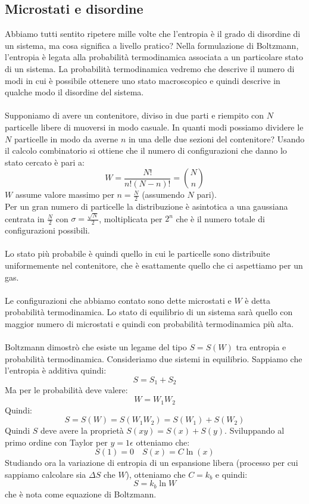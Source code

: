 \documentclass{article}
\begin{document}
\subsection{Microstati e disordine}
Abbiamo tutti sentito ripetere mille volte che l'entropia è il grado di disordine di un sistema, ma cosa significa a livello pratico? Nella formulazione di Boltzmann, l'entropia è legata alla probabilità termodinamica associata a un particolare stato di un sistema. La probabilità termodinamica vedremo che descrive il numero di modi in cui è possibile ottenere uno stato macroscopico e quindi descrive in qualche modo il disordine del sistema.\\\\
Supponiamo di avere un contenitore, diviso in due parti e riempito con $N$ particelle libere di muoversi in modo casuale. In quanti modi possiamo dividere le $N$ particelle in modo da averne $n$ in una delle due sezioni del contenitore? Usando il calcolo combinatorio si ottiene che il numero di configurazioni che danno lo stato cercato è pari a:
$$ W = \frac{N!}{n!(N-n)!} = \binom{N}{n} $$
$W$ assume valore massimo per $n=\frac{N}{2}$ (assumendo $N$ pari).\\
Per un gran numero di particelle la distribuzione è asintotica a una gaussiana centrata in $\frac{N}{2}$ con $\sigma=\frac{\sqrt{N}}{2}$, moltiplicata per $2^n$ che è il numero totale di configurazioni possibili.\\\\
Lo stato più probabile è quindi quello in cui le particelle sono distribuite uniformemente nel contenitore, che è esattamente quello che ci aspettiamo per un gas.\\\\
Le configurazioni che abbiamo contato sono dette microstati e $W$ è detta probabilità termodinamica. Lo stato di equilibrio di un sistema sarà quello con maggior numero di microstati e quindi con probabilità termodinamica più alta.\\\\
Boltzmann dimostrò che esiste un legame del tipo $S=S(W)$ tra entropia e probabilità termodinamica. Consideriamo due sistemi in equilibrio. Sappiamo che l'entropia è additiva quindi:
$$ S = S_1+S_2 $$
Ma per le probabilità deve valere:
$$ W = W_1W_2 $$
Quindi:
$$ S = S(W) = S(W_1W_2) = S(W_1) + S(W_2) $$
Quindi $S$ deve avere la proprietà $S(xy) = S(x) + S(y)$. Sviluppando al primo ordine con Taylor per $y=1\epsilon$ otteniamo che:
$$ S(1)=0 \quad S(x) = C\ln(x) $$
Studiando ora la variazione di entropia di un espansione libera (processo per cui sappiamo calcolare sia $\Delta S$ che $W$), otteniamo che $C=k_b$ e quindi:
$$ S = k_b\ln W $$
che è nota come equazione di Boltzmann.
\end{document}
